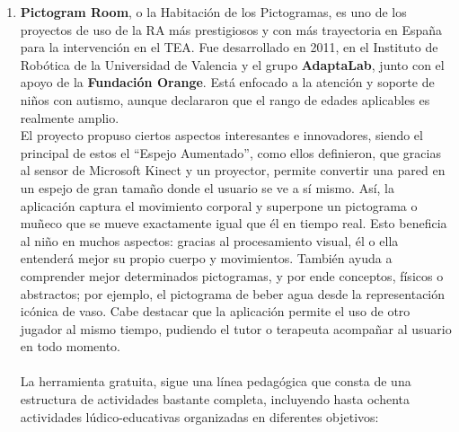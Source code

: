 \documentclass[12pt,twoside,titlepage]{report}
\begin{document}
\begin{enumerate}[label=\textbf{\arabic*.}, leftmargin=1.5cm, itemsep=0.5em]
  \item \textbf{Pictogram Room}, o la Habitación de los Pictogramas, es uno de los proyectos de uso de la RA más prestigiosos y con más trayectoria en España para la intervención en el TEA.
Fue desarrollado en 2011, en el Instituto de Robótica de la Universidad de Valencia y el grupo \textbf{AdaptaLab}, junto con el apoyo de la \textbf{Fundación Orange}.
Está enfocado a la atención y soporte de niños con autismo, aunque declararon que el rango de edades aplicables es realmente amplio.
\\
El proyecto propuso ciertos aspectos interesantes e innovadores, siendo el principal de estos el ``Espejo Aumentado'', como ellos definieron, que gracias al sensor de Microsoft Kinect y un proyector, permite convertir una pared en un espejo de gran tamaño donde el usuario se ve a sí mismo.
Así, la aplicación captura el movimiento corporal y superpone un pictograma o muñeco que se mueve exactamente igual que él en tiempo real.
Esto beneficia al niño en muchos aspectos: gracias al procesamiento visual, él o ella entenderá mejor su propio cuerpo y movimientos.
También ayuda a comprender mejor determinados pictogramas, y por ende conceptos, físicos o abstractos; por ejemplo, el pictograma de beber agua desde la representación icónica de vaso.
Cabe destacar que la aplicación permite el uso de otro jugador al mismo tiempo, pudiendo el tutor o terapeuta acompañar al usuario en todo momento.
\\\\
La herramienta gratuita, sigue una línea pedagógica que consta de una estructura de actividades bastante completa, incluyendo hasta ochenta actividades lúdico-educativas organizadas en diferentes objetivos:


\end{enumerate}
\end{document}
